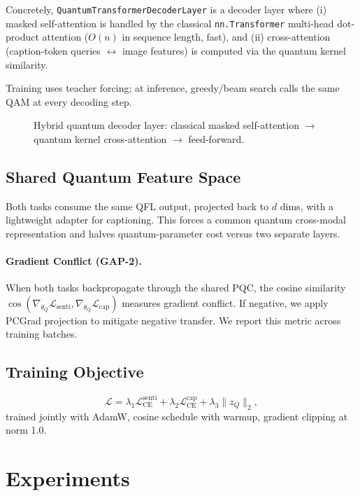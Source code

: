 \documentclass[11pt]{article}
\begin{document}
Concretely, \texttt{QuantumTransformerDecoderLayer} is a decoder layer where
(i) masked self-attention is handled by the classical \texttt{nn.Transformer}
multi-head dot-product attention ($O(n)$ in sequence length, fast), and
(ii) cross-attention (caption-token queries $\leftrightarrow$ image features)
is computed via the quantum kernel similarity.

Training uses teacher forcing; at inference, greedy/beam search calls the
same QAM at every decoding step.

\begin{figure}[t]
  \centering
  \caption{Hybrid quantum decoder layer: classical masked self-attention
           $\to$ quantum kernel cross-attention $\to$ feed-forward.}
  \label{fig:hybrid}
\end{figure}

\subsection{Shared Quantum Feature Space}
\label{sec:shared}
Both tasks consume the same QFL output, projected back to $d$ dims, with a
lightweight adapter for captioning. This forces a common quantum
cross-modal representation and halves quantum-parameter cost versus two
separate layers.

\paragraph{Gradient Conflict (GAP-2).}
When both tasks backpropagate through the shared PQC, the cosine similarity
$\cos(\nabla_{\theta_Q} \mathcal{L}_{\text{senti}},
      \nabla_{\theta_Q} \mathcal{L}_{\text{cap}})$ measures gradient conflict.
If negative, we apply PCGrad \citep{yu2020pcgrad} projection to mitigate
negative transfer. We report this metric across training batches.

\subsection{Training Objective}
\begin{equation}
\mathcal{L} = \lambda_1 \mathcal{L}_{\text{CE}}^{\text{senti}}
            + \lambda_2 \mathcal{L}_{\text{CE}}^{\text{cap}}
            + \lambda_3 \| z_Q \|_2 ,
\end{equation}
trained jointly with AdamW, cosine schedule with warmup, gradient clipping at
norm 1.0.

\section{Experiments}
\label{sec:experiments}
\end{document}
